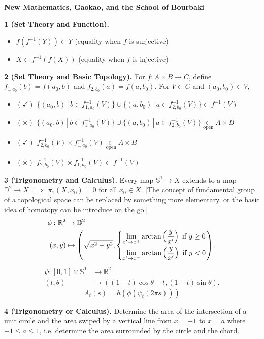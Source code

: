 \documentclass[10pt]{article}
\begin{document}
\begin{CJK*}{UTF8}{gbsn}
\newpage
\textbf{New Mathematics, Gaokao, and the School of Bourbaki}

\textbf{1 (Set Theory and Function).} \begin{itemize}
\item $f(f^{-1}(Y))\subset Y$ (equality when $f$ is surjective)
\item $X\subset f^{-1}(f(X))$ (equality when $f$ is injective)
\end{itemize}

\textbf{2 (Set Theory and Basic Topology).} For $f:A\times B\to C$, define $f_{1,a_0}(b)=f(a_0,b)$ and $f_{2,b_0}(a)=f(a,b_0)$. For $V\subset C$ and $(a_0,b_0)\in V$,
\begin{itemize}
\item $(\checkmark)$ $\{(a_0,b)\,|\,b\in f_{1,a_0}^{-1}(V)\}\cup\{(a,b_0)\,|\,a\in f_{2,b_0}^{-1}(V)\}\subset f^{-1}(V)$
\item $(\times)$ $\{(a_0,b)\,|\,b\in f_{1,a_0}^{-1}(V)\}\cup\{(a,b_0)\,|\,a\in f_{2,b_0}^{-1}(V)\}\underset{\text{open}}{\subset}A\times B$
\item $(\checkmark)$ $f_{2,b_0}^{-1}(V)\times f_{1,a_0}^{-1}(V)\underset{\text{open}}{\subset}A\times B$
\item $(\times)$ $f_{2,b_0}^{-1}(V)\times f_{1,a_0}^{-1}(V)\subset f^{-1}(V)$
\end{itemize}

\textbf{3 (Trigonometry and Calculus).} Every map $\mathbb{S}^1\to X$ extends to a map $\mathbb{D}^2\to X$ $\implies$ $\pi_1(X,x_0)=0$ for all $x_0\in X$. [The concept of fundamental group of a topological space can be replaced by something more elementary, or the basic idea of homotopy can be introduce on the go.]
\begin{align*}\phi:\mathbb{R}^2&\to\mathbb{D}^2\\(x,y)&\mapsto\left(\sqrt{x^2+y^2},\begin{dcases}\lim_{x'\to x^+}\arctan\left(\frac{y}{x'}\right)\text{ if }y\geq0\\\lim_{x'\to x^-}\arctan\left(\frac{y}{x'}\right)\text{ if }y<0\end{dcases}\right).\end{align*}
\begin{align*}\psi:[0,1]\times\mathbb{S}^1&\to\mathbb{R}^2\\(t,\theta)&\mapsto((1-t)\cos\theta+t,(1-t)\sin\theta).\end{align*}
$$A_t(s)=h(\phi(\psi_t(2\pi s)))$$

\textbf{4 (Trigonometry or Calculus).} Determine the area of the intersection of a unit circle and the area swiped by a vertical line from $x=-1$ to $x=a$ where $-1\leq a\leq 1$, i.e. determine the area surrounded by the circle and the chord.


\end{CJK*}
\end{document}
